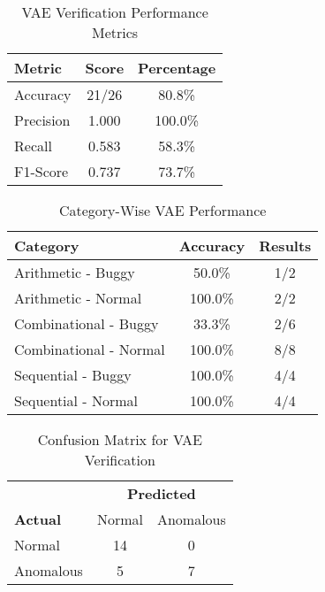 \documentclass{article}
\begin{document}
\begin{table}[h]
\centering
\caption{VAE Verification Performance Metrics}
\label{tab:vae_metrics}
\begin{tabular}{lcc}
\toprule
\textbf{Metric} & \textbf{Score} & \textbf{Percentage} \\
\midrule
Accuracy & 21/26 & 80.8\% \\
Precision & 1.000 & 100.0\% \\
Recall & 0.583 & 58.3\% \\
F1-Score & 0.737 & 73.7\% \\
\bottomrule
\end{tabular}
\end{table}

\begin{table}[h]
\centering
\caption{Category-Wise VAE Performance}
\label{tab:category_breakdown}
\begin{tabular}{lcc}
\toprule
\textbf{Category} & \textbf{Accuracy} & \textbf{Results} \\
\midrule
Arithmetic - Buggy & 50.0\% & 1/2 \\
Arithmetic - Normal & 100.0\% & 2/2 \\
Combinational - Buggy & 33.3\% & 2/6 \\
Combinational - Normal & 100.0\% & 8/8 \\
Sequential - Buggy & 100.0\% & 4/4 \\
Sequential - Normal & 100.0\% & 4/4 \\
\bottomrule
\end{tabular}
\end{table}

\begin{table}[h]
\centering
\caption{Confusion Matrix for VAE Verification}
\label{tab:confusion_matrix}
\begin{tabular}{lcc}
\toprule
& \multicolumn{2}{c}{\textbf{Predicted}} \\
\cmidrule(lr){2-3}
\textbf{Actual} & Normal & Anomalous \\
\midrule
Normal & 14 & 0 \\
Anomalous & 5 & 7 \\
\bottomrule
\end{tabular}
\end{table}
\end{document}
